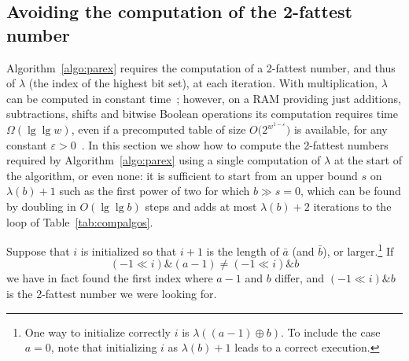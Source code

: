 \documentclass[a4paper]{article}
\newcommand{\?}{\mskip1.5mu}
\renewcommand{\epsilon}{\varepsilon}
\begin{document}
\subsection{Avoiding the computation of the 2-fattest number}

Algorithm~\ref{algo:parex} requires the computation of a 2-fattest number, and thus of $\lambda$ (the index of the highest bit set), at each
iteration. With multiplication, $\lambda$ can be computed in constant time~\cite[Section~5]{FrWSITBFT}; however, on a RAM providing just additions,
subtractions, shifts and bitwise Boolean operations its computation requires time $\Omega(\lg \lg w)$, even if a precomputed table of
size $O\bigl(2^{w^{1-\epsilon}}\bigr)$ is available, for any constant $\epsilon>0$~\cite[Theorem~15]{Brodnik1997Transdichotomous}.
In this section we show how to compute the 2-fattest numbers required by Algorithm~\ref{algo:parex} using
a single computation of $\lambda$ at the start of the algorithm, or even none: it is sufficient to start from an upper bound
$s$ on $\lambda(b)+1$ such as the first power of two for which $b\gg s=0$, which can be found by doubling in $O(\lg\lg b)$ steps
and adds at most $\lambda(b)+2$ iterations to the loop of Table~\ref{tab:compalgos}. 

Suppose that $i$ is initialized
so that $i+1$ is the length of $\bar a$ (and $\bar b$), or larger.\footnote{One way to initialize
correctly $i$ is $\lambda((a-1)\oplus b)$. 
To include the case $a=0$, note that initializing $i$ as $\lambda(b)+1$ leads
to a correct execution. } If
\begin{equation}
\label{cond:twofattest}
	(-1\ll i)\mathbin\&(a-1) \neq (-1\ll i)\mathbin\& b
\end{equation}
we have in fact found the first index where $a-1$ and $b$ differ, and $(-1\ll i)\mathbin\& b$
is the 2-fattest number we were looking for.
\end{document}
